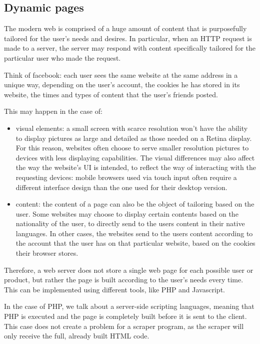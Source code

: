 \documentclass[LaM,oneside,binding=0.6cm]{sapthesis}
\begin{document}
\subsection{Dynamic pages}

The modern web is comprised of a huge amount of content that is purposefully tailored for the user's needs and desires. In particular, when an HTTP request is made to a server, the server may respond with content specifically tailored for the particular user who made the request.

Think of facebook: each user sees the same website at the same address in a unique way, depending on the user's account, the cookies he has stored in its website, the times and types of content that the user's friends posted.

This may happen in the case of:

\begin{itemize}
	\item visual elements: a small screen with scarce resolution won't have the ability to display pictures as large and detailed as those needed on a Retina display. For this reason, websites often choose to serve smaller resolution pictures to devices with less displaying capabilities. The visual differences may also affect the way the website's UI is intended, to reflect the way of interacting with the requesting devices: mobile browsers used via touch input often require a different interface design than the one used for their desktop version.
	\item content: the content of a page can also be the object of tailoring based on the user. Some websites may choose to display certain contents based on the nationality of the user, to directly send to the users content in their native languages. In other cases, the websites send to the users content according to the account that the user has on that particular website, based on the cookies their browser stores. 
\end{itemize}

Therefore, a web server does not store a single web page for each possible user or product, but rather the page is built according to the user's needs every time.
This can be implemented using different tools, like PHP and Javascript.

In the case of PHP, we talk about a server-side scripting languages, meaning that PHP is executed and the page is completely built before it is sent to the client. This case does not create a problem for a scraper program, as the scraper will only receive the full, already built HTML code.
\end{document}
